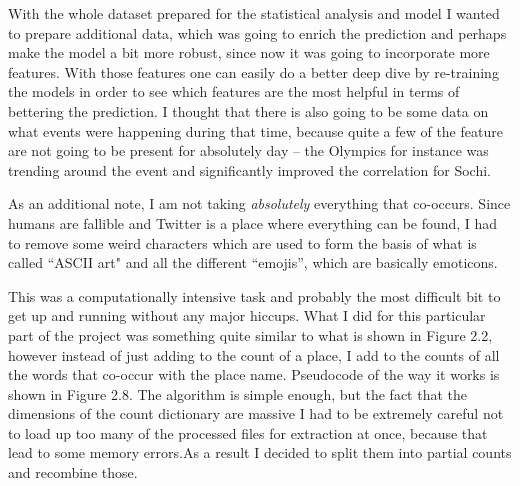 \documentclass[minf,twoside,singlespacing,parskip,frontabs,notimes,11pt]{infthesis}
\begin{document}
With the whole dataset prepared for the statistical analysis and model I wanted to prepare additional data, which was going to enrich the prediction and perhaps make the model a bit more robust, since now it was going to incorporate  more features. With those features one can easily do a better deep dive by re-training the models in order to see which features are the most  helpful in terms of bettering the prediction. I thought that there is also going to be some data on what events were happening during that time, because quite a few of the feature are not going to be present for absolutely day -- the Olympics for instance was trending around the event and significantly improved the correlation for Sochi. 


As an additional note, I am not taking \textit{absolutely} everything that co-occurs. Since humans are fallible and Twitter is a place where everything can be found, I had to remove some weird characters which are used to form the basis of what is called ``ASCII art" and all the different ``emojis'', which are basically emoticons.


This was a computationally intensive task and probably the most difficult bit to get up and running without any major hiccups. What I did for this particular part of the project was something quite similar to what is shown in Figure 2.2, however instead of just adding to the count of a place, I add to the counts of all the words that co-occur with the place name.  Pseudocode of the way it works is shown in Figure 2.8. The algorithm is simple enough, but the fact that the dimensions of the count dictionary are massive I had to be extremely careful not to load up too many of the processed files for extraction at once, because that lead to some memory errors.As a result I decided to split them into partial counts and recombine those. 
\end{document}
